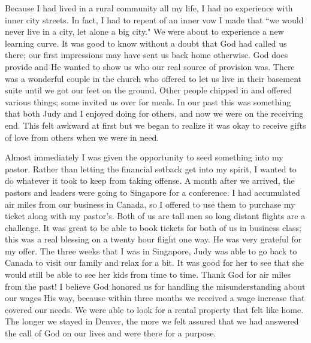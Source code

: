 \documentclass[oneside]{book}
\begin{document}
Because I had lived in a rural community all my life, I had no experience with inner city streets.  In fact, I had to repent of an inner vow I made that ``we would never live in a city, let alone a big city." We were about to experience a new learning curve. It was good to know without a doubt that God had called us there; our first impressions may have sent us back home otherwise. God does provide and He wanted to show us who our real source of provision was. There was a wonderful couple in the church who offered to let us live in their basement suite until we got our feet on the ground. Other people chipped in and offered various things; some invited us over for meals. In our past this was something that both Judy and I enjoyed doing for others, and now we were on the receiving end. This felt awkward at first but we began to realize it was okay to receive gifts of love from others when we were in need. 

Almost immediately I was given the opportunity to seed something into my pastor. Rather than letting the financial setback get into my spirit, I wanted to do whatever it took to keep from taking offense. A month after we arrived, the pastors and leaders were going to Singapore for a conference. I had accumulated air miles from our business in Canada, so I offered to use them to purchase my ticket along with my pastor's. Both of us are tall men so long distant flights are a challenge. It was great to be able to book tickets for both of us in business class; this was a real blessing on a twenty hour flight one way. He was very grateful for my offer. The three weeks that I was in Singapore, Judy was able to go back to Canada to visit our family and relax for a bit. It was good for her to see that she would still be able to see her kids from time to time. Thank God for air miles from the past! I believe God honored us for handling the misunderstanding about our wages His way, because within three months we received a wage increase that covered our needs. We were able to look for a rental property that felt like home. The longer we stayed in Denver, the more we felt assured that we had answered the call of God on our lives and were there for a purpose. 
\end{document}
